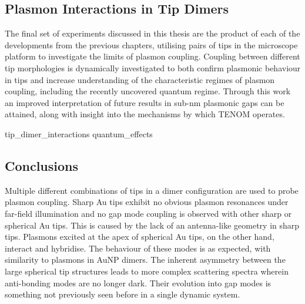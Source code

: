 \documentclass[12pt, a4paper, twoside]{book}
\begin{document}
\begin{singlespace}
\color{white}\chapter{Plasmon Interactions in Tip Dimers}
\label{ch:tip_interactions}
\end{singlespace}


The final set of experiments discussed in this thesis are the product of each of the developments from the previous chapters, utilising pairs of tips in the microscope platform to investigate the limits of plasmon coupling. Coupling between different tip morphologies is dynamically investigated to both confirm plasmonic behaviour in tips and increase understanding of the characteristic regimes of plasmon coupling, including the recently uncovered quantum regime. Through this work an improved interpretation of future results in sub-nm plasmonic gaps can be attained, along with insight into the mechanisms by which TENOM operates.

{tip_dimer_interactions}
{quantum_effects}

\section{Conclusions}

Multiple different combinations of tips in a dimer configuration are used to probe plasmon coupling. Sharp Au tips exhibit no obvious plasmon resonances under far-field illumination and no gap mode coupling is observed with other sharp or spherical Au tips. This is caused by the lack of an antenna-like geometry in sharp tips. Plasmons excited at the apex of spherical Au tips, on the other hand, interact and hybridise. The behaviour of these modes is as expected, with similarity to plasmons in AuNP dimers. The inherent asymmetry between the large spherical tip structures leads to more complex scattering spectra wherein anti-bonding modes are no longer dark. Their evolution into gap modes is something not previously seen before in a single dynamic system.
\end{document}
